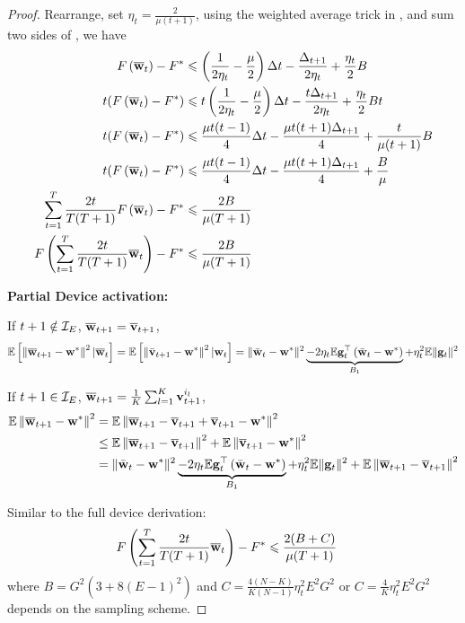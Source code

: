 \begin{proof}
Rearrange, set $\eta_t = \frac{2}{\mu(t+1)} $, using the weighted average trick in \cite{lacoste2012simpler}, and sum two sides of \eq{\ref{eq:scvxnsmth5}}, we have
\begin{align}
F\left({\overline{\mathbf{w}}}_{t}\right)-F^{*} &\leqslant \left(\frac{1}{2 \eta_{t}}-\frac{\mu}{2}\right) \Delta t-\frac{\Delta_{t+1}}{2 \eta_{t}}+\frac{\eta_{t}}{2} B\\
t(F\left({\overline{\mathbf{w}}}_{t}\right)-F^{*}) & \leqslant t\left(\frac{1}{2 \eta_{t}}-\frac{\mu}{2}\right) \Delta t-\frac{t\Delta_{t+1}}{2 \eta_{t}}+\frac{\eta_{t}}{2} Bt\\
t(F\left({\overline{\mathbf{w}}}_{t}\right)-F^{*}) & \leqslant \frac{\mu t(t-1)}{4} \Delta t- \frac{\mu t(t+1)\Delta_{t+1}}{4}+\frac{t}{\mu(t+1)} B\\
t(F\left({\overline{\mathbf{w}}}_{t}\right)-F^{*}) & \leqslant \frac{\mu t(t-1)}{4} \Delta t- \frac{\mu t(t+1)\Delta_{t+1}}{4}+\frac{B}{\mu}\\
\sum_{t=1}^T \frac{2t}{T(T+1)}F\left({\overline{\mathbf{w}}}_{t}\right)-F^{*} & \leqslant \frac{2B}{\mu(T+1)} \\
F\left(\sum_{t=1}^T \frac{2t}{T(T+1)} {\overline{\mathbf{w}}}_{t}\right)-F^{*} & \leqslant \frac{2B}{\mu(T+1)} 
\end{align}

\textbf{Partial Device activation: }

If $t + 1 \notin {\mathcal{I}}_{E}$, ${\overline{\mathbf{w}}}_{t+1} = {\overline{\mathbf{v}}}_{t+1}$, 
\begin{align}
\mathbb{E}\left[\left\|{\overline{\mathbf{w}}}_{t+1}-{\mathbf{w}}^{*}\right\|^2| {\overline{\mathbf{w}}}_{t}\right] = \mathbb{E}\left[\left\|\bar{{\mathbf{v}}}_{t+1}-{\mathbf{w}}^{*}\right\|^2| {\mathbf{w}}_{t}\right]=\|\bar{{\mathbf{w}}}_{t}-{\mathbf{w}}^{*}\|^{2} \underbrace{ - 2 \eta_{t} \mathbb{E} {\mathbf{g}}_{t}^{\top}\left(\bar{{\mathbf{w}}}_{t}-{\mathbf{w}}^{*}\right)}_{B_1} + \eta_{t}^{2} \mathbb{E}\| {\mathbf{g}}_{t} \|^{2}	
\label{eq:expandp1}
\end{align}

If $t + 1 \in {\mathcal{I}}_{E}$, ${\overline{\mathbf{w}}}_{t+1} = \frac{1}{K}\sum_{l=1}^K {\mathbf{v}}_{t+1}^{i_l}$, 
\begin{align}
\mathbb{E}\left\|{\overline{\mathbf{w}}}_{t+1}-{\mathbf{w}}^{*}\right\|^2 & =  \mathbb{E}\left\|{\overline{\mathbf{w}}}_{t+1} - {\overline{\mathbf{v}}}_{t+1} + {\overline{\mathbf{v}}}_{t+1} -{\mathbf{w}}^{*}\right\|^2 \\
& \leq \mathbb{E}\left\|{\overline{\mathbf{w}}}_{t+1} - {\overline{\mathbf{v}}}_{t+1}\right\|^2 + \mathbb{E} \left\| {\overline{\mathbf{v}}}_{t+1} -{\mathbf{w}}^{*}\right\|^2 \\
&= \|\bar{{\mathbf{w}}}_{t}-{\mathbf{w}}^{*}\|^{2} \underbrace{ - 2 \eta_{t} \mathbb{E} {\mathbf{g}}_{t}^{\top}\left(\bar{{\mathbf{w}}}_{t}-{\mathbf{w}}^{*}\right)}_{B_1} + \eta_{t}^{2} \mathbb{E}\| {\mathbf{g}}_{t} \|^{2}	+ \mathbb{E}\left\|{\overline{\mathbf{w}}}_{t+1} - {\overline{\mathbf{v}}}_{t+1}\right\|^2
\label{eq:expandp2}
\end{align}


Similar to the full device derivation:
\begin{align}
F\left(\sum_{t=1}^T \frac{2t}{T(T+1)} {\overline{\mathbf{w}}}_{t}\right)-F^{*} & \leqslant \frac{2(B + C)}{\mu(T+1)} 	
\end{align}
where $B =  G^2 (3  + 8 (E-1)^2)$ and $C =\frac{4(N - K)}{K(N-1)} \eta_t^2 E^2G^2 $ or
$C = \frac{4}{K} \eta_t^2 E^2G^2$ depends on the sampling scheme.



\end{proof}